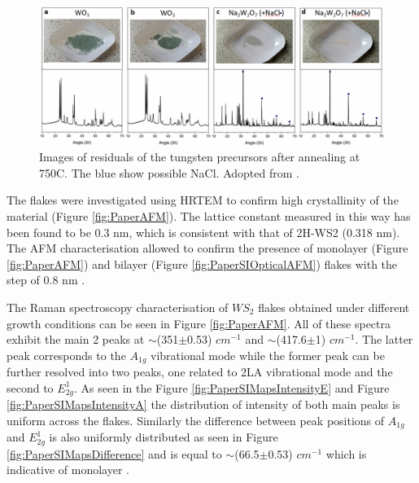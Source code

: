\begin{figure}[h]
		\begin{center}
		\includegraphics[scale=0.3]{PaperSIXRDOptical.png}
		\caption{Images of residuals of the tungsten precursors after annealing at 750{\degree}C. The blue show possible NaCl. Adopted from \cite{Reale2017}.}
		\label{fig:PaperSIXRDOptical}
	\end{center}
\end{figure}

The flakes were investigated using HRTEM to confirm high crystallinity of the material (Figure \ref{fig:PaperAFM}). The lattice constant measured in this way has been found to be 0.3 nm, which is consistent with that of 2H-WS2 (0.318 nm). The AFM characterisation allowed to confirm the presence of monolayer (Figure \ref{fig:PaperAFM}) and bilayer (Figure \ref{fig:PaperSIOpticalAFM}) flakes with the step of 0.8 nm \cite{Wu2014}\cite{Rasmussen2015}.

The Raman spectroscopy characterisation of $WS_2$ flakes obtained under different growth conditions can be seen in Figure \ref{fig:PaperAFM}. All of these spectra exhibit the main 2 peaks at {$\sim$}(351{$\pm$}0.53) $cm^{−1}$ and {$\sim$}(417.6{$\pm$}1) $cm^{−1}$. The latter peak corresponds to the $A_{1g}$ vibrational mode while the former peak can be further resolved into two peaks, one related to 2LA vibrational mode and the second to $E^1_{2g}$. As seen in the Figure \ref{fig:PaperSIMapsIntensityE} and Figure \ref{fig:PaperSIMapsIntensityA} the distribution of intensity of both main peaks is uniform across the flakes. Similarly the difference between peak positions of $A_{1g}$ and $E^1_{2g}$ is also uniformly distributed as seen in Figure \ref{fig:PaperSIMapsDifference} and is equal to {$\sim$}(66.5{$\pm$}0.53) $cm^{−1}$ which is indicative of monolayer \cite{Withers2014}.

